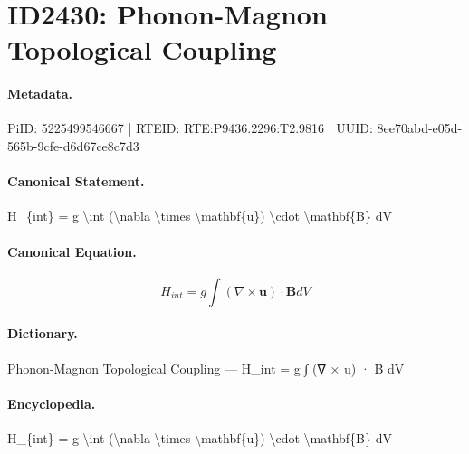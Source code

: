 \section*{ID2430: Phonon-Magnon Topological Coupling}
\paragraph{Metadata.}
PiID: 5225499546667 | RTEID: RTE:P9436.2296:T2.9816 | UUID: 8ee70abd-e05d-565b-9cfe-d6d67ce8c7d3

\paragraph{Canonical Statement.}
H\_\{int\} = g \textbackslash{}int (\textbackslash{}nabla \textbackslash{}times \textbackslash{}mathbf\{u\}) \textbackslash{}cdot \textbackslash{}mathbf\{B\} dV

\paragraph{Canonical Equation.}
\[
H_{int} = g \int (\nabla \times \mathbf{u}) \cdot \mathbf{B} dV
\]

\paragraph{Dictionary.}
Phonon-Magnon Topological Coupling — H\_int = g ∫ (∇ × u) · B dV

\paragraph{Encyclopedia.}
H\_\{int\} = g \textbackslash{}int (\textbackslash{}nabla \textbackslash{}times \textbackslash{}mathbf\{u\}) \textbackslash{}cdot \textbackslash{}mathbf\{B\} dV

